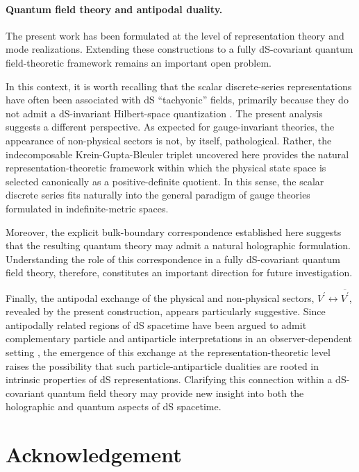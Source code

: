\documentclass[aps,twocolumn,nofootinbib]{revtex4}
\begin{document}
{\paragraph{Quantum field theory and antipodal duality.} The present work has been formulated at the level of representation theory and mode realizations. Extending these constructions to a fully dS-covariant quantum field-theoretic framework remains an important open problem.

In this context, it is worth recalling that the scalar discrete-series representations have often been associated with dS ``tachyonic'' fields, primarily because they do not admit a dS-invariant Hilbert-space quantization \cite{GazeauFoundPhys}. The present analysis suggests a different perspective. As expected for gauge-invariant theories, the appearance of non-physical sectors is not, by itself, pathological. Rather, the indecomposable Krein-Gupta-Bleuler triplet uncovered here provides the natural representation-theoretic framework within which the physical state space is selected canonically as a positive-definite quotient. In this sense, the scalar discrete series fits naturally into the general paradigm of gauge theories formulated in indefinite-metric spaces.

Moreover, the explicit bulk-boundary correspondence established here suggests that the resulting quantum theory may admit a natural holographic formulation. Understanding the role of this correspondence in a fully dS-covariant quantum field theory, therefore, constitutes an important direction for future investigation.

Finally, the antipodal exchange of the physical and non-physical sectors, $V^\prime \longleftrightarrow \overline{V^\prime}$, revealed by the present construction, appears particularly suggestive. Since antipodally related regions of dS spacetime have been argued to admit complementary particle and antiparticle interpretations in an observer-dependent setting \cite{GazeauEPL}, the emergence of this exchange at the representation-theoretic level raises the possibility that such particle-antiparticle dualities are rooted in intrinsic properties of dS representations. Clarifying this connection within a dS-covariant quantum field theory may provide new insight into both the holographic and quantum aspects of dS spacetime.


\section*{Acknowledgement}

}
\end{document}

